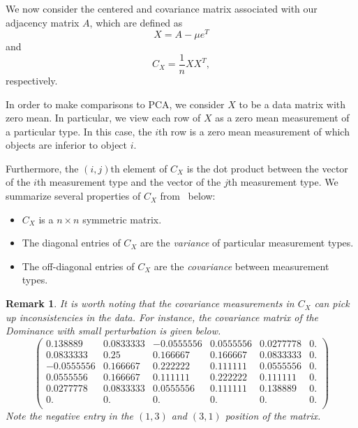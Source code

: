 \documentclass{article}
\newtheorem{remark}[theorem]{Remark}
\begin{document}
We now consider the centered and covariance matrix associated with our adjacency matrix $A$, which are defined as
\begin{equation}\label{eq: cen}
X = A-\mu e^{T}
\end{equation}
and
\begin{equation}\label{eq: cov}
C_{X} = \frac{1}{n}XX^{T},
\end{equation}
respectively. 

In order to make comparisons to PCA, we consider $X$ to be a data matrix with zero mean.
In particular, we view each row of $X$ as a zero mean measurement of a particular type.
In this case, the $i$th row is a zero mean measurement of which objects are inferior to object $i$. 

Furthermore, the $(i,j)$th element of $C_{X}$ is the dot product between the vector of the $i$th measurement type and the vector of the $j$th measurement type.
We summarize several properties of $C_{X}$ from~\cite{Shlens} below:
\begin{itemize}
\item	$C_{X}$ is a $n\times n$ symmetric matrix.
\item The diagonal entries of $C_{X}$ are the \emph{variance} of particular measurement types.
\item The off-diagonal entries of $C_{X}$ are the \emph{covariance} between measurement types. 
\end{itemize}

\begin{remark}
It is worth noting that the covariance measurements in $C_{X}$ can pick up inconsistencies in the data. 
For instance, the covariance matrix of the Dominance with small perturbation is given below.
\[
\left(
\begin{array}{cccccc}
 0.138889 & 0.0833333 & -0.0555556 & 0.0555556 & 0.0277778 & 0. \\
 0.0833333 & 0.25 & 0.166667 & 0.166667 & 0.0833333 & 0. \\
 -0.0555556 & 0.166667 & 0.222222 & 0.111111 & 0.0555556 & 0. \\
 0.0555556 & 0.166667 & 0.111111 & 0.222222 & 0.111111 & 0. \\
 0.0277778 & 0.0833333 & 0.0555556 & 0.111111 & 0.138889 & 0. \\
 0. & 0. & 0. & 0. & 0. & 0. \\
\end{array}
\right)
\]
Note the negative entry in the $(1,3)$ and $(3,1)$ position of the matrix. 
\end{remark}
\end{document}
